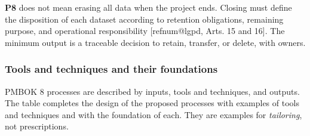 \documentclass[12pt,a4paper,article,oneside,brazil,english]{abntex2}
\makeatletter
\newcommand{\refnum}[1]{\csname refnum@#1\endcsname}
\makeatother
\begin{document}
\textbf{P8} does not mean erasing all data when the project ends. Closing must define the disposition of each dataset according to retention obligations, remaining purpose, and operational responsibility [\refnum{lgpd}, Arts. 15 and 16]. The minimum output is a traceable decision to retain, transfer, or delete, with owners.
\subsubsection{Tools and techniques and their foundations}

PMBOK 8 processes are described by inputs, tools and techniques, and outputs. The table completes the design of the proposed processes with examples of tools and techniques and with the foundation of each. They are examples for \textit{tailoring}, not prescriptions.
\end{document}
